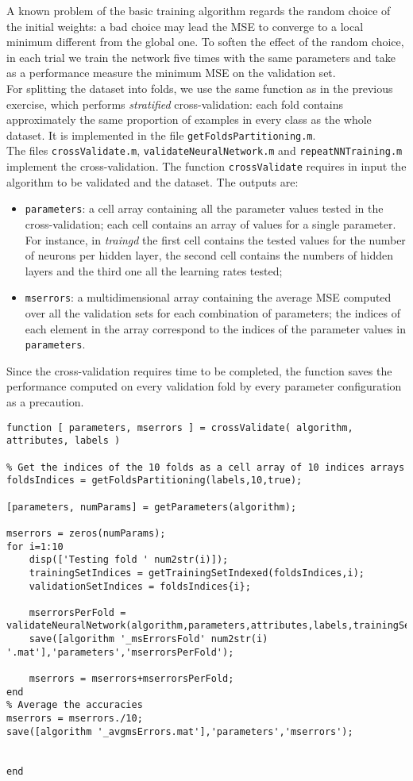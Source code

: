 \documentclass{article}
\begin{document}
A known problem of the basic training algorithm regards the random choice of the initial weights: a bad choice may lead the MSE to converge to a local minimum different from the global one. To soften the effect of the random choice, in each trial we train the network five times with the same parameters and take as a performance measure the minimum MSE on the validation set.\\
For splitting the dataset into folds, we use the same function as in the previous exercise, which performs \emph{stratified} cross-validation: each fold contains approximately the same proportion of examples in every class as the whole dataset. It is implemented in the file \verb$getFoldsPartitioning.m$.\\
The files \verb$crossValidate.m$, \verb$validateNeuralNetwork.m$ and \verb$repeatNNTraining.m$ implement the cross-validation. The function \verb$crossValidate$ requires in input the algorithm to be validated and the dataset. The outputs are:
\begin{itemize}
	\item \verb$parameters$: a cell array containing all the parameter values tested in the cross-validation; each cell contains an array of values for a single parameter. For instance, in \emph{traingd} the first cell contains the tested values for the number of neurons per hidden layer, the second cell contains the numbers of hidden layers and the third one all the learning rates tested;
	\item \verb$mserrors$: a multidimensional array containing the average MSE computed over all the validation sets for each combination of parameters; the indices of each element in the array correspond to the indices of the parameter values in \verb$parameters$.
\end{itemize}
Since the cross-validation requires time to be completed, the function saves the performance computed on every validation fold by every parameter configuration as a precaution.
\begin{lstlisting}[breaklines=true]
function [ parameters, mserrors ] = crossValidate( algorithm, attributes, labels )

% Get the indices of the 10 folds as a cell array of 10 indices arrays
foldsIndices = getFoldsPartitioning(labels,10,true);

[parameters, numParams] = getParameters(algorithm);

mserrors = zeros(numParams);
for i=1:10
    disp(['Testing fold ' num2str(i)]);
    trainingSetIndices = getTrainingSetIndexed(foldsIndices,i);
    validationSetIndices = foldsIndices{i};
    
    mserrorsPerFold = validateNeuralNetwork(algorithm,parameters,attributes,labels,trainingSetIndices,validationSetIndices);
    save([algorithm '_msErrorsFold' num2str(i) '.mat'],'parameters','mserrorsPerFold');
    
    mserrors = mserrors+mserrorsPerFold;
end
% Average the accuracies
mserrors = mserrors./10;
save([algorithm '_avgmsErrors.mat'],'parameters','mserrors');


end


\end{lstlisting}
\end{document}
